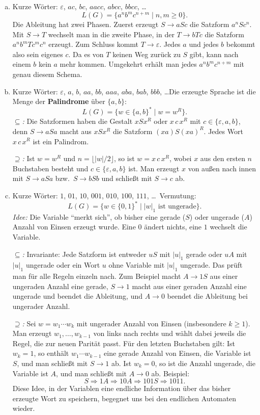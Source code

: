\begin{loesung}
\begin{enumerate}[a)]
  \item Kurze Wörter: $\varepsilon$, $ac$, $bc$, $aacc$, $abcc$, $bbcc$, \ldots
  \[L(G)=\{a^nb^mc^{n+m}\mid n,m\geq 0\}.\]
  Die Ableitung hat zwei Phasen. Zuerst erzeugt $S\to aSc$ die Satzform $a^nSc^n$. Mit $S\to T$ wechselt man in die zweite Phase, in der $T\to bTc$ die Satzform $a^nb^mTc^mc^n$ erzeugt. Zum Schluss kommt $T\to\varepsilon$. Jedes $a$ und jedes $b$ bekommt also sein eigenes $c$. Da es von $T$ keinen Weg zurück zu $S$ gibt, kann nach einem $b$ kein $a$ mehr kommen. Umgekehrt erhält man jedes $a^nb^mc^{n+m}$ mit genau diesem Schema.

  \item Kurze Wörter: $\varepsilon$, $a$, $b$, $aa$, $bb$, $aaa$, $aba$, $bab$, $bbb$, \ldots Die erzeugte Sprache ist die Menge der \textbf{Palindrome} über $\{a,b\}$:
  \[L(G)=\{w\in\{a,b\}^*\mid w=w^R\}.\]
  \emph{$\subseteq$:} Die Satzformen haben die Gestalt $xSx^R$ oder $x\,c\,x^R$ mit $c\in\{\varepsilon,a,b\}$, denn $S\to aSa$ macht aus $xSx^R$ die Satzform $(xa)S(xa)^R$. Jedes Wort $x\,c\,x^R$ ist ein Palindrom.

  \emph{$\supseteq$:} Ist $w=w^R$ und $n=\lfloor|w|/2\rfloor$, so ist $w=x\,c\,x^R$, wobei $x$ aus den ersten $n$ Buchstaben besteht und $c\in\{\varepsilon,a,b\}$ ist. Man erzeugt $x$ von außen nach innen mit $S\to aSa$ bzw.\ $S\to bSb$ und schließt mit $S\to c$ ab.

  \item Kurze Wörter: $1$, $01$, $10$, $001$, $010$, $100$, $111$, \ldots\ Vermutung:
  \[L(G)=\{w\in\{0,1\}^*\mid |w|_1\text{ ist ungerade}\}.\]
  \emph{Idee:} Die Variable \enquote{merkt sich}, ob bisher eine gerade ($S$) oder ungerade ($A$) Anzahl von Einsen erzeugt wurde. Eine $0$ ändert nichts, eine $1$ wechselt die Variable.

  \emph{$\subseteq$:} Invariante: Jede Satzform ist entweder $uS$ mit $|u|_1$ gerade oder $uA$ mit $|u|_1$ ungerade oder ein Wort $u$ ohne Variable mit $|u|_1$ ungerade. Das prüft man für alle Regeln einzeln nach. Zum Beispiel macht $A\to 1S$ aus einer ungeraden Anzahl eine gerade, $S\to 1$ macht aus einer geraden Anzahl eine ungerade und beendet die Ableitung, und $A\to 0$ beendet die Ableitung bei ungerader Anzahl.

  \emph{$\supseteq$:} Sei $w=w_1\cdots w_k$ mit ungerader Anzahl von Einsen (insbesondere $k\geq1$). Man erzeugt $w_1,\dots,w_{k-1}$ von links nach rechts und wählt dabei jeweils die Regel, die zur neuen Parität passt. Für den letzten Buchstaben gilt: Ist $w_k=1$, so enthält $w_1\cdots w_{k-1}$ eine gerade Anzahl von Einsen, die Variable ist $S$, und man schließt mit $S\to1$ ab. Ist $w_k=0$, so ist die Anzahl ungerade, die Variable ist $A$, und man schließt mit $A\to0$ ab. Beispiel:
  \[S\Rightarrow 1A\Rightarrow 10A\Rightarrow 101S\Rightarrow 1011.\]
  Diese Idee, in der Variablen eine endliche Information über das bisher erzeugte Wort zu speichern, begegnet uns bei den endlichen Automaten wieder.


\end{enumerate}
\end{loesung}
